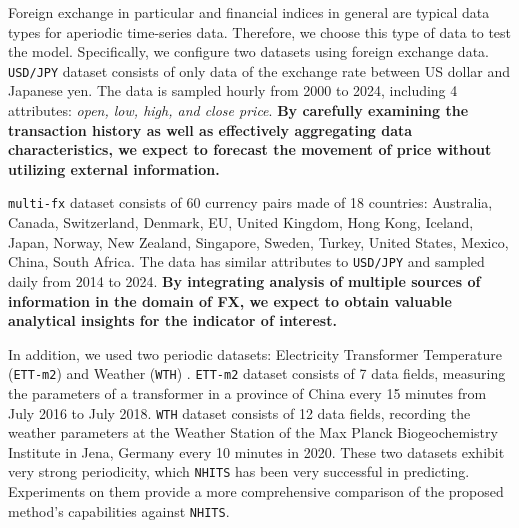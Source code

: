 Foreign exchange in particular and financial indices in general are typical data types for aperiodic time-series data. Therefore, we choose this type of data to test the model. Specifically, we configure two datasets using foreign exchange data. \verb|USD/JPY| dataset consists of only data of the exchange rate between US dollar and Japanese yen. The data is sampled hourly from 2000 to 2024, including 4 attributes: \textit{open, low, high, and close price}. \textbf{By carefully examining the transaction history as well as effectively aggregating data characteristics, we expect to forecast the movement of price without utilizing external information.}

\verb|multi-fx| dataset consists of 60 currency pairs made of 18 countries: Australia, Canada, Switzerland, Denmark, EU, United Kingdom, Hong Kong, Iceland, Japan, Norway, New Zealand, Singapore, Sweden, Turkey, United States, Mexico, China, South Africa. The data has similar attributes to \verb|USD/JPY| and sampled daily from 2014 to 2024. \textbf{By integrating analysis of multiple sources of information in the domain of FX, we expect to obtain valuable analytical insights for the indicator of interest.}


In addition, we used two periodic datasets: Electricity Transformer Temperature (\verb|ETT-m2|) \cite{zhou2021informer} and Weather (\verb|WTH|) \cite{Kolle}. \verb|ETT-m2| dataset consists of 7 data fields, measuring the parameters of a transformer in a province of China every 15 minutes from July 2016 to July 2018. \verb|WTH| dataset consists of 12 data fields, recording the weather parameters at the Weather Station of the Max Planck Biogeochemistry Institute in Jena, Germany every 10 minutes in 2020. These two datasets exhibit very strong periodicity, which \verb|NHITS| has been very successful in predicting. Experiments on them provide a more comprehensive comparison of the proposed method's capabilities against \verb|NHITS|.

